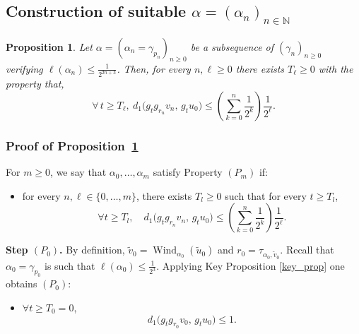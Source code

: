 \documentclass[a4paper,english,reqno]{amsart}
\newcommand{\R}{\mathbb{R}}
\newcommand{\N}{\mathbb{N}} %
\newtheorem{proposition}{Proposition}
\theoremstyle{definition}
\numberwithin{equation}{section}
\begin{document}
\subsection{Construction of suitable $\alpha=(\alpha_n)_{n\in\N }$}



\begin{proposition}\label{lema_clave}
	Let $\alpha=(\alpha_n=\gamma_{p_n})_{n\geq0}$ be a subsequence of $(\gamma_n)_{n\geq0}$ verifying $\ell({\alpha_n})\leq \frac{1}{2^{2n+3}}$. Then, 
	for every $n,\ell\geq 0$ there exists $T_\ell\ge 0$ with the property that,
	\[\forall \,t\ge T_\ell,~
	d_1\bigl(g_t g_{r_n}v_n,\, g_t u_0\bigr)
	\le \left(\sum_{k=0}^{n}\frac{1}{2^{k}}\right)\frac{1}{2^{\ell}} .
	\]
\end{proposition}

%

\subsubsection*{Proof of Proposition~\ref{lema_clave}}
For $m\ge 0$, we say that $\alpha_0,\dots,\alpha_m$ satisfy Property $(P_m)$ if:
\begin{itemize}
	\item for every $n,\ell\in\{0,\dots,m\}$, there exists $T_l\ge 0$ such that for every $t\ge T_l$,
	\[ \forall t\ge T_l,\quad
	d_1\bigl(g_t g_{r_n} v_n,\, g_t u_0\bigr)
	\le \left(\sum_{k=0}^{n}\frac{1}{2^{k}}\right)\frac{1}{2^{\ell}} .
	\]
\end{itemize}

\medskip
\noindent\textbf{Step $(P_0)$.}
By definition, $\tilde v_0=\operatorname{Wind}_{\alpha_0}(\tilde u_0)$ and $r_0=\tau_{\alpha_0,\tilde v_0}$.
Recall that $\alpha_0=\gamma_{p_0}$ is such that $\ell(\alpha_0)\le \frac{1}{2^3}$.
Applying Key Proposition \ref{key_prop} one obtains $(P_0)$:
\begin{itemize}
	\item$\forall t\ge T_0=0$,
	\[
	d_1\bigl(g_tg_{r_0} v_0,\, g_t u_0\bigr)\le 1.
	\]
\end{itemize}
\end{document}
